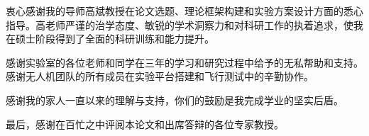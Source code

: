 \thesisacknowledgement

衷心感谢我的导师高斌教授在论文选题、理论框架构建和实验方案设计方面的悉心指导。高老师严谨的治学态度、敏锐的学术洞察力和对科研工作的执着追求，使我在硕士阶段得到了全面的科研训练和能力提升。

感谢实验室的各位老师和同学在三年的学习和研究过程中给予的无私帮助和支持。感谢无人机团队的所有成员在实验平台搭建和飞行测试中的辛勤协作。

感谢我的家人一直以来的理解与支持，你们的鼓励是我完成学业的坚实后盾。

最后，感谢在百忙之中评阅本论文和出席答辩的各位专家教授。